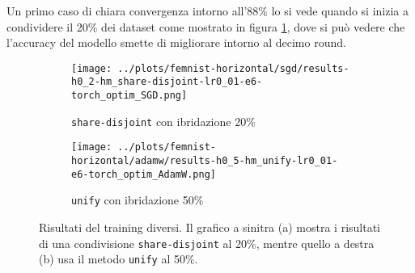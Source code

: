 Un primo caso di chiara convergenza intorno all'88\% lo si vede quando 
si inizia a condividere il 20\% dei dataset come mostrato in figura 
\ref{fig:femnists2sgd}, dove si può vedere che l'accuracy del modello 
smette di migliorare intorno al decimo round.
\begin{figure}[hb]  %
    \centering
    \begin{subfigure}[b]{0.49\textwidth}
        \centering
        \texttt{[image: ../plots/femnist-horizontal/sgd/results-h0\_2-hm\_share-disjoint-lr0\_01-e6-torch\_optim\_SGD.png]}
        \caption{\texttt{share-disjoint} con ibridazione 20\%}
        \label{fig:femnists2sgd}
    \end{subfigure}
    \hfill\begin{subfigure}[b]{0.49\textwidth}
        \centering
        \texttt{[image: ../plots/femnist-horizontal/adamw/results-h0\_5-hm\_unify-lr0\_01-e6-torch\_optim\_AdamW.png]}
        \caption{\texttt{unify} con ibridazione 50\%}
        \label{fig:feministu5adam}
    \end{subfigure}
    
    \caption{
        Risultati del training diversi. Il grafico a sinitra (a) 
        mostra i risultati di una condivisione \texttt{share-disjoint}
        al 20\%, mentre quello a destra (b) usa il metodo 
        \texttt{unify} al 50\%.
    }
    \label{fig:femnistadam}
\end{figure}

